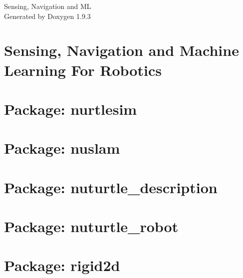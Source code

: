 \documentclass[twoside]{book}
\newcommand{\+}{\discretionary{\mbox{\scriptsize$\hookleftarrow$}}{}{}}
\newcommand{\clearemptydoublepage}{%
    \newpage{\pagestyle{empty}\cleardoublepage}%
  }
\begin{document}
  \raggedbottom
    \hypersetup{pageanchor=false,
                bookmarksnumbered=true,
                pdfencoding=unicode
               }
  \begin{titlepage}
  \vspace*{7cm}
  \begin{center}%
  {\Large Sensing, Navigation and ML}\\
  \vspace*{1cm}
  {\large Generated by Doxygen 1.9.3}\\
  \end{center}
  \end{titlepage}
  \clearemptydoublepage
  \tableofcontents
  \clearemptydoublepage
  \hypersetup{pageanchor=true}
\chapter{Sensing, Navigation and Machine Learning For Robotics}
\label{index}\hypertarget{index}{}
\chapter{Package\+: nurtlesim}
\label{md_nurtlesim_README}

\chapter{Package\+: nuslam}
\label{md_nuslam_README}

\chapter{Package\+: nuturtle\+\_\+description}
\label{md_nuturtle_description_README}

\chapter{Package\+: nuturtle\+\_\+robot}
\label{md_nuturtle_robot_README}

\chapter{Package\+: rigid2d}
\label{md_rigid2d_README}

\end{document}
